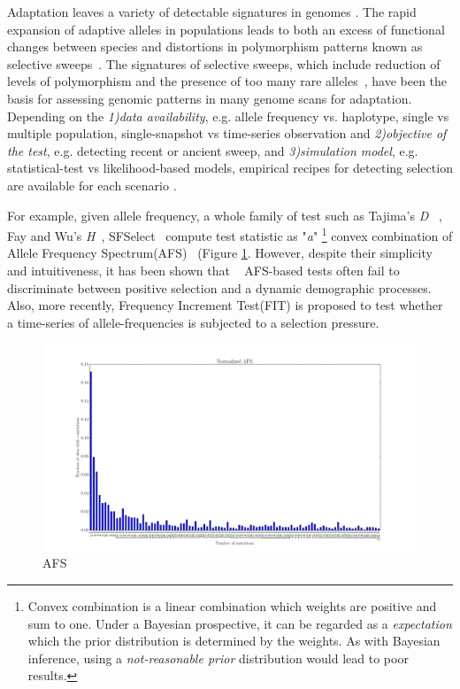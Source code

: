 \documentclass[11pt]{article}
\begin{document}
Adaptation leaves a variety of detectable signatures in
genomes \cite{nielsen2005genomic,akey2009constructing,
kreitman2000methods,messer2013population,sabeti2006positive}.
The rapid expansion of adaptive alleles in populations leads to both an excess
of functional changes between species and distortions in polymorphism patterns
known as selective sweeps~\cite{nielsen2005genomic}. The signatures of
selective sweeps, which include reduction of levels of polymorphism and the
presence of too many rare alleles~\cite{nielsen2005genomic,
przeworski2002signature}, have been the basis for assessing genomic
patterns in many genome scans for adaptation. Depending on the
\emph{1)data availability}, e.g. allele frequency vs. haplotype, single vs 
multiple  population, single-snapshot vs time-series observation and 
\emph{2)objective of the test}, e.g. detecting recent or ancient
sweep, and \emph{3)simulation model}, e.g. statistical-test vs likelihood-based 
models, empirical recipes for detecting selection are available for each
scenario \cite{sabeti2006positive}.

For example, given allele frequency, a whole family of test such as 
Tajima's \emph{D} ~\cite{tajima1989statistical}, 
Fay and Wu's \emph{H}~\cite{fay2000hitchhiking}, 
SFSelect~\cite{ronen2013learning} compute test statistic as "\emph{a}"
\footnote{Convex combination is a linear combination which weights are positive
	 and sum to one. Under a Bayesian prospective, it can be regarded as a
	  \emph{expectation} which the prior distribution is determined by the
	   weights. As with Bayesian inference, using a \emph{not-reasonable prior}
	    distribution would lead to poor results.} 
	convex 
combination of Allele Frequency Spectrum(AFS)~\cite{achaz2009frequency} 
(Figure \ref{fig:afs}. 
However, despite their simplicity and intuitiveness, it has been shown that
 ~\cite{ptak2002evidence, ramos2002statistical} AFS-based tests often fail 
 to discriminate between positive selection and a dynamic
demographic processes. Also, more recently, Frequency Increment
 Test(FIT) \cite{feder2014Identifying} is  proposed to test whether a
  time-series of allele-frequencies is subjected to a selection pressure.
\begin{figure}
	\centering
	\includegraphics[scale=0.2]{afs}
	\caption{AFS}	\label{fig:afs}
\end{figure}
\end{document}
